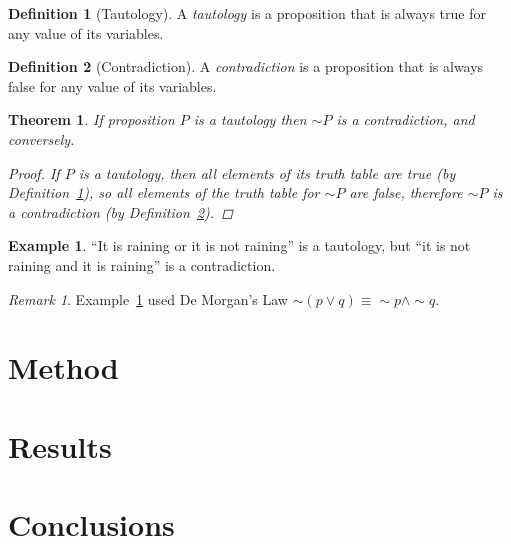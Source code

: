 \documentclass[oneside,12pt]{scrbook}
\theoremstyle{plain}
\newtheorem{theorem}{Theorem}
\theoremstyle{definition}
\newtheorem{defn}{Definition}
\newtheorem{xmpl}{Example}
\theoremstyle{remark}
\newtheorem{remark}{Remark}
\begin{document}
\begin{defn}[Tautology]\label{def:tautology}
A \emph{tautology} is a proposition that is always true for any
value of its variables.
\end{defn}
\begin{defn}[Contradiction]\label{def:contradiction}
A \emph{contradiction} is a proposition that is always false for
any value of its variables.
\end{defn}
\begin{theorem}
If proposition $P$ is a tautology then $\sim P$ is a
contradiction, and conversely.
\begin{proof}
If $P$ is a tautology, then all elements of its truth table are
true (by Definition~\ref{def:tautology}), so all elements of the
truth table for $\sim P$ are false, therefore $\sim P$ is a
contradiction (by Definition~\ref{def:contradiction}).
\end{proof}
\end{theorem}
\begin{xmpl}\label{ex:rain}
``It is raining or it is not raining'' is a tautology, but ``it is
not raining and it is raining'' is a contradiction.
\end{xmpl}
\begin{remark}
Example~\ref{ex:rain} used De Morgan's Law $\sim (p \vee q)
\equiv \sim p \wedge \sim q$.
\end{remark}

\lipsum

\chapter{Method}
\label{ch:method}

\lipsum

\chapter{Results}
\label{ch:results}

\lipsum

\chapter{Conclusions}
\label{ch:conc}

\lipsum

\backmatter


\end{document}
